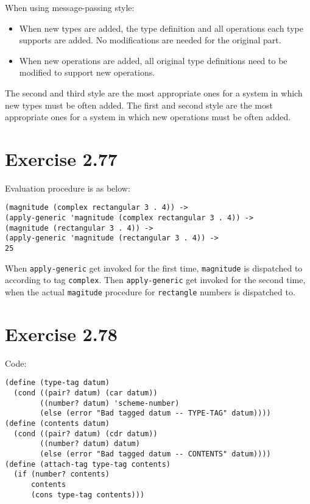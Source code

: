 \documentclass[../main.tex]{subfiles}
\begin{document}
When using message-passing style:

\begin{itemize}
\item When new types are added, the type definition
 and all operations each type supports are added.
 No modifications are needed for the original part.
\item When new operations are added, all
 original type definitions need to be modified
 to support new operations.
\end{itemize}

The second and third style are the most appropriate
 ones for a system in which new types must be often added.
 The first and second style are the most appropriate
 ones for a system in which new operations must be often
 added.

\section{Exercise 2.77}

Evaluation procedure is as below:

\begin{lstlisting}
(magnitude (complex rectangular 3 . 4)) ->
(apply-generic 'magnitude (complex rectangular 3 . 4)) ->
(magnitude (rectangular 3 . 4)) ->
(apply-generic 'magnitude (rectangular 3 . 4)) ->
25
\end{lstlisting}

When \lstinline{apply-generic} get invoked for the first time,
 \lstinline{magnitude} is dispatched to according to tag
 \lstinline{complex}. Then \lstinline{apply-generic} get invoked
 for the second time, when the actual \lstinline{magitude}
 procedure for \lstinline{rectangle} numbers is dispatched to.

\section{Exercise 2.78}

Code:

\begin{lstlisting}
(define (type-tag datum)
  (cond ((pair? datum) (car datum))
        ((number? datum) 'scheme-number)
        (else (error "Bad tagged datum -- TYPE-TAG" datum))))
(define (contents datum)
  (cond ((pair? datum) (cdr datum))
        ((number? datum) datum)
        (else (error "Bad tagged datum -- CONTENTS" datum))))
(define (attach-tag type-tag contents)
  (if (number? contents)
      contents
      (cons type-tag contents)))
\end{lstlisting}
\end{document}
